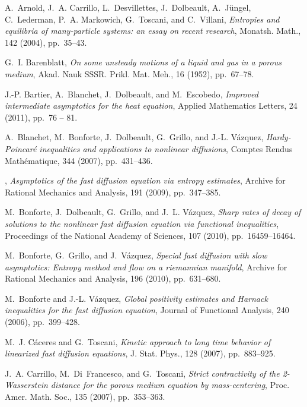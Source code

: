 \begin{thebibliography}{10}

{\sc A.~Arnold, J.~A. Carrillo, L.~Desvillettes, J.~Dolbeault, A.~J{\"u}ngel,
  C.~Lederman, P.~A. Markowich, G.~Toscani, and C.~Villani}, {\em Entropies and
  equilibria of many-particle systems: an essay on recent research}, Monatsh.
  Math., 142 (2004), pp.~35--43.

{\sc G.~I. Barenblatt}, {\em On some unsteady motions of a liquid and gas in a
  porous medium}, Akad. Nauk SSSR. Prikl. Mat. Meh., 16 (1952), pp.~67--78.

{\sc J.-P. Bartier, A.~Blanchet, J.~Dolbeault, and M.~Escobedo}, {\em Improved
  intermediate asymptotics for the heat equation}, Applied Mathematics Letters,
  24 (2011), pp.~76 -- 81.

{\sc A.~Blanchet, M.~Bonforte, J.~Dolbeault, G.~Grillo, and J.-L. V\'azquez},
  {\em {H}ardy-{P}oincar{\'e} inequalities and applications to nonlinear
  diffusions}, Comptes Rendus Math{\'e}matique, 344 (2007), pp.~431--436.

\leavevmode\vrule height 2pt depth -1.6pt width 23pt, {\em Asymptotics of the
  fast diffusion equation via entropy estimates}, Archive for Rational
  Mechanics and Analysis, 191 (2009), pp.~347--385.

{\sc M.~Bonforte, J.~Dolbeault, G.~Grillo, and J.~L. V{\'a}zquez}, {\em {Sharp
  rates of decay of solutions to the nonlinear fast diffusion equation via
  functional inequalities}}, Proceedings of the National Academy of Sciences,
  107 (2010), pp.~16459--16464.

{\sc M.~Bonforte, G.~Grillo, and J.~V{\'a}zquez}, {\em Special fast diffusion
  with slow asymptotics: Entropy method and flow on a riemannian manifold},
  Archive for Rational Mechanics and Analysis, 196 (2010), pp.~631--680.

{\sc M.~Bonforte and J.-L. V\'azquez}, {\em Global positivity estimates and
  {H}arnack inequalities for the fast diffusion equation}, Journal of
  Functional Analysis, 240 (2006), pp.~399--428.

{\sc M.~J. C\'aceres and G.~Toscani}, {\em Kinetic approach to long time
  behavior of linearized fast diffusion equations}, J. Stat. Phys., 128 (2007),
  pp.~883--925.

{\sc J.~A. Carrillo, M.~Di~Francesco, and G.~Toscani}, {\em Strict
  contractivity of the 2-{W}asserstein distance for the porous medium equation
  by mass-centering}, Proc. Amer. Math. Soc., 135 (2007), pp.~353--363.


\end{thebibliography}
